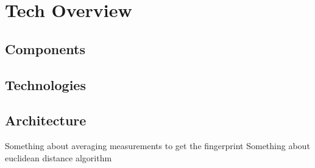 \chapter{Tech Overview}
\label{tech-overview}
%

\section{Components}
%

\section{Technologies}
%

\section{Architecture}
%


Something about averaging measurements to get the fingerprint
Something about euclidean distance algorithm
